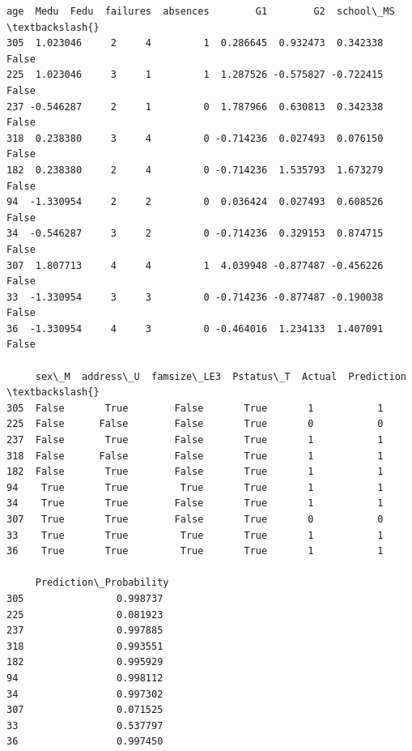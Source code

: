 \documentclass[9pt]{article}
\makeatletter
\newcommand{\boxspacing}{\kern\kvtcb@left@rule\kern\kvtcb@boxsep}
\newcommand{\prompt}[4]{
        {\ttfamily\llap{{\color{#2}[#3]:\hspace{3pt}#4}}\vspace{-\baselineskip}}
    }
\makeatother
\begin{document}
            \begin{tcolorbox}[breakable, size=fbox, boxrule=.5pt, pad at break*=1mm, opacityfill=0]
\prompt{Out}{outcolor}{28}{\boxspacing}
\begin{Verbatim}[commandchars=\\\{\}]
          age  Medu  Fedu  failures  absences        G1        G2  school\_MS  \textbackslash{}
305  1.023046     2     4         1  0.286645  0.932473  0.342338      False
225  1.023046     3     1         1  1.287526 -0.575827 -0.722415      False
237 -0.546287     2     1         0  1.787966  0.630813  0.342338      False
318  0.238380     3     4         0 -0.714236  0.027493  0.076150      False
182  0.238380     2     4         0 -0.714236  1.535793  1.673279      False
94  -1.330954     2     2         0  0.036424  0.027493  0.608526      False
34  -0.546287     3     2         0 -0.714236  0.329153  0.874715      False
307  1.807713     4     4         1  4.039948 -0.877487 -0.456226      False
33  -1.330954     3     3         0 -0.714236 -0.877487 -0.190038      False
36  -1.330954     4     3         0 -0.464016  1.234133  1.407091      False

     sex\_M  address\_U  famsize\_LE3  Pstatus\_T  Actual  Prediction  \textbackslash{}
305  False       True        False       True       1           1
225  False      False        False       True       0           0
237  False       True        False       True       1           1
318  False      False        False       True       1           1
182  False       True        False       True       1           1
94    True       True         True       True       1           1
34    True       True        False       True       1           1
307   True       True        False       True       0           0
33    True       True         True       True       1           1
36    True       True         True       True       1           1

     Prediction\_Probability
305                0.998737
225                0.081923
237                0.997885
318                0.993551
182                0.995929
94                 0.998112
34                 0.997302
307                0.071525
33                 0.537797
36                 0.997450
\end{Verbatim}
\end{tcolorbox}
        
\end{document}

